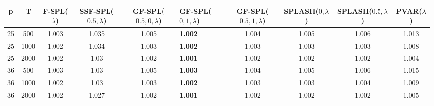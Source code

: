 \begin{tabular}{ccccclcccc}
\hline
  p  &  T   &  F-SPL($\lambda$)  &  SSF-SPL($0.5, \lambda$)  &  GF-SPL($0.5, 0, \lambda$)  & GF-SPL($0, 1, \lambda$)   &  GF-SPL($0.5, 1, \lambda$)  &  SPLASH($0, \lambda$)  &  SPLASH($0.5, \lambda$)  &  PVAR($\lambda$)  \\
\hline
 25  & 500  &       1.003        &           1.035           &            1.005            & \textbf{1.002}            &            1.004            &         1.005          &          1.006           &       1.013       \\
 25  & 1000 &       1.002        &           1.034           &            1.003            & \textbf{1.002}            &            1.003            &         1.003          &          1.003           &       1.008       \\
 25  & 2000 &       1.002        &           1.03            &            1.002            & \textbf{1.001}            &            1.002            &         1.002          &          1.002           &       1.004       \\
 36  & 500  &       1.003        &           1.03            &            1.005            & \textbf{1.003}            &            1.004            &         1.005          &          1.006           &       1.015       \\
 36  & 1000 &       1.002        &           1.03            &            1.003            & \textbf{1.002}            &            1.003            &         1.003          &          1.004           &       1.009       \\
 36  & 2000 &       1.002        &           1.027           &            1.002            & \textbf{1.001}            &            1.002            &         1.002          &          1.002           &       1.005       \\
\hline
\end{tabular}